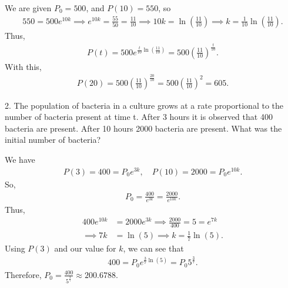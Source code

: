 \documentclass{report}
\begin{document}
    \bigbreak \noindent 
    We are given $P_{0} =500$, and $P(10) = 550$, so 
    \begin{align*}
        550 = 500e^{10k} \implies e^{10k} = \frac{55}{50} = \frac{11}{10} \implies 10k = \ln{\left(\frac{11}{10}\right)} \implies k = \frac{1}{10}\ln{\left(\frac{11}{10}\right)}
    .\end{align*}
    Thus,
    \begin{align*}
        P(t) = 500e^{\frac{t}{10}\ln{\left(\frac{11}{10}\right)}} = 500\left(\frac{11}{10}\right)^{\frac{t}{10}}
    .\end{align*}
    With this,
    \begin{align*}
        P(20) = 500\left(\frac{11}{10}\right)^{\frac{20}{10}} = 500\left(\frac{11}{10}\right)^{2}  = 605
    .\end{align*}

    

    \bigbreak \noindent 
    \begin{mdframed}
        2. The population of bacteria in a culture grows at a rate proportional to the number of bacteria present at time t. After 3 hours it is observed that 400 bacteria are present. After 10 hours 2000 bacteria are present. What was the initial number of bacteria?
    \end{mdframed}
    \bigbreak \noindent 
    We have
    \begin{align*}
        P(3) = 400 = P_{0}e^{3k}, \quad P(10) = 2000 = P_{0}e^{10k}
    .\end{align*}
    So,
    \begin{align*}
        P_{0} = \frac{400}{e^{3k}} = \frac{2000}{e^{10k}}
    .\end{align*}
    Thus,
    \begin{align*}
        400e^{10k} &= 2000e^{3k} \implies \frac{2000}{400} = 5 = e^{7k} \\
        \implies 7k &= \ln{\left(5\right)} \implies k = \frac{1}{7}\ln{\left(5\right)}
    .\end{align*}
    Using $P(3)$ and our value for $k$, we can see that
    \begin{align*}
       400 = P_{0}e^{\frac{3}{7}\ln{\left(5\right)}}  = P_{0}5^{\frac{3}{7}} 
    .\end{align*}
    Therefore, $P_{0}  = \frac{400}{5^{\frac{3}{7}}} \approx 200.6788$.
\end{document}

